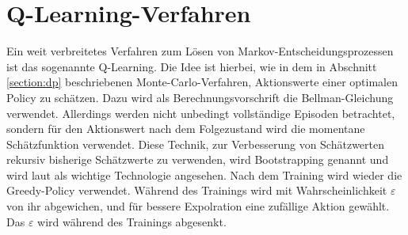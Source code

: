 \section{Q-Learning-Verfahren}
\label{section:qlearning}
Ein weit verbreitetes Verfahren zum Lösen von Markov-Entscheidungsprozessen ist das sogenannte Q-Learning.
Die Idee ist hierbei, wie in dem in Abschnitt \ref{section:dp} beschriebenen Monte-Carlo-Verfahren, Aktionswerte einer optimalen Policy zu schätzen.
Dazu wird als Berechnungsvorschrift die Bellman-Gleichung verwendet.
Allerdings werden nicht unbedingt vollständige Episoden betrachtet, sondern für den Aktionswert nach dem Folgezustand wird die momentane Schätzfunktion verwendet.
Diese Technik, zur Verbesserung von Schätzwerten rekursiv bisherige Schätzwerte zu verwenden, wird Bootstrapping genannt und wird laut \cite{Sutton1998} als wichtige Technologie angesehen.
Nach dem Training wird wieder die Greedy-Policy verwendet.
Während des Trainings wird mit Wahrscheinlichkeit $\varepsilon$ von ihr abgewichen, und für bessere Expolration eine zufällige Aktion gewählt.
Das $\varepsilon$ wird während des Trainings abgesenkt.


